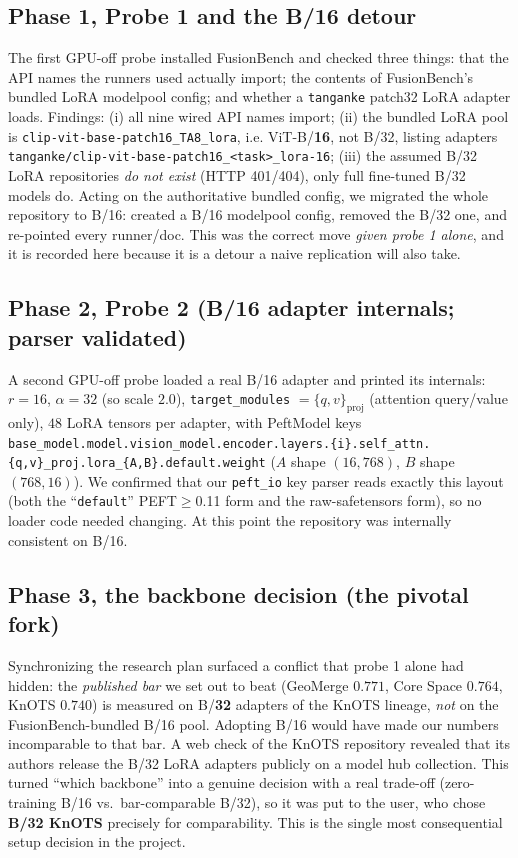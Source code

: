 \documentclass[11pt]{article}
\begin{document}
\subsection{Phase 1, Probe 1 and the B/16 detour}
\label{app:phase-probe1}
The first GPU-off probe installed FusionBench and checked three things: that the API names the runners
used actually import; the contents of FusionBench's bundled LoRA modelpool config; and whether a
\texttt{tanganke} patch32 LoRA adapter loads. Findings: (i) all nine wired API names import; (ii) the
bundled LoRA pool is \texttt{clip-vit-base-patch16\_TA8\_lora}, i.e. ViT-B/\textbf{16}, not B/32, listing
adapters \texttt{tanganke/clip-vit-base-patch16\_<task>\_lora-16}; (iii) the assumed B/32 LoRA
repositories \emph{do not exist} (HTTP 401/404), only full fine-tuned B/32 models do. Acting on the
authoritative bundled config, we migrated the whole repository to B/16: created a B/16 modelpool config,
removed the B/32 one, and re-pointed every runner/doc. This was the correct move \emph{given probe 1
alone}, and it is recorded here because it is a detour a naive replication will also take.

\subsection{Phase 2, Probe 2 (B/16 adapter internals; parser validated)}
A second GPU-off probe loaded a real B/16 adapter and printed its internals: $r=16$, $\alpha=32$ (so
scale $2.0$), \texttt{target\_modules} $=\{q,v\}_{\text{proj}}$ (attention query/value only), $48$ LoRA
tensors per adapter, with PeftModel keys
\texttt{base\_model.model.vision\_model.encoder.layers.\{i\}.self\_attn.\{q,v\}\_proj.lora\_\{A,B\}.default.weight}
($A$ shape $(16,768)$, $B$ shape $(768,16)$). We confirmed that our \texttt{peft\_io} key parser reads
exactly this layout (both the ``\texttt{default}'' PEFT$\ge$0.11 form and the raw-safetensors form), so no
loader code needed changing. At this point the repository was internally consistent on B/16.

\subsection{Phase 3, the backbone decision (the pivotal fork)}
\label{app:phase-backbone}
Synchronizing the research plan surfaced a conflict that probe 1 alone had hidden: the \emph{published
bar} we set out to beat (GeoMerge $0.771$, Core Space $0.764$, KnOTS $0.740$) is measured on B/\textbf{32}
adapters of the KnOTS lineage, \emph{not} on the FusionBench-bundled B/16 pool. Adopting B/16 would have
made our numbers incomparable to that bar. A web check of the KnOTS repository revealed that its authors
release the B/32 LoRA adapters publicly on a model hub collection. This turned ``which backbone'' into a
genuine decision with a real trade-off (zero-training B/16 vs.\ bar-comparable B/32), so it was put to the
user, who chose \textbf{B/32 KnOTS} precisely for comparability. This is the single most consequential
setup decision in the project.
\end{document}
